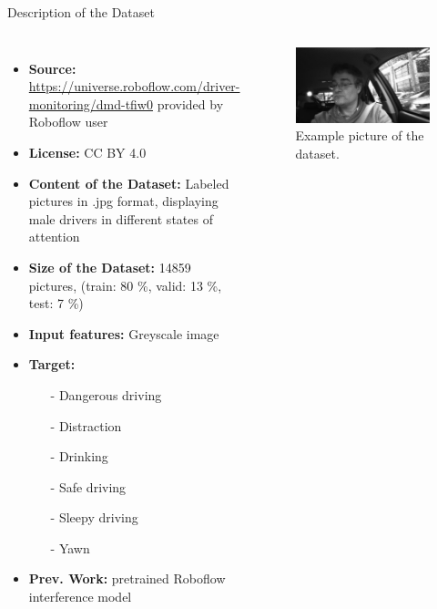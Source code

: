 \begin{frame}{\huge{Description of the Dataset}}
  \begin{columns}
      \begin{itemize}
        \item \textbf{Source:} \url{https://universe.roboflow.com/driver-monitoring/dmd-tfiw0} provided by Roboflow user
        \item \textbf{License:} CC BY 4.0
        \item \textbf{Content of the Dataset:} Labeled pictures in .jpg format, displaying male drivers in different states of attention
        \item \textbf{Size of the Dataset:} 14859 pictures, (train: 80 \%, valid: 13 \%, test: 7 \%)
        \item \textbf{Input features:} Greyscale image
        \item \textbf{Target:}
        \begin{itemize}
          \item[-] Dangerous driving
          \item[-] Distraction
          \item[-] Drinking
          \item[-] Safe driving
          \item[-] Sleepy driving
          \item[-] Yawn
        \end{itemize}
        \item \textbf{Prev. Work:} pretrained Roboflow interference model 
      \end{itemize}
      \begin{figure}
        \centering
        \includegraphics[width=\textwidth]{content/gA_1_s1_ir_face_mp4-26_jpg.rf.8073bccb5c613d34b8f058da71adc5d8.jpg}
        \caption{Example picture of the dataset.}
      \end{figure}
  \end{columns}
\end{frame}

